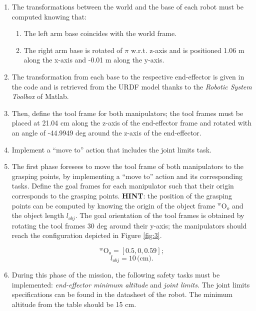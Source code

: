 \documentclass{article}
\begin{document}
\begin{enumerate}
	\item The transformations between the world and the base of each robot must be computed knowing that: 
	\begin{enumerate}
		\item The left arm base coincides with the world frame.
		\item The right arm base is rotated of $\pi$ w.r.t. z-axis and is positioned 1.06 m along the x-axis and -0.01 m along the y-axis.
		
	\end{enumerate}

	\item The transformation from each base to the respective end-effector is given in the code and is retrieved from the URDF model thanks to the \textit{Robotic System Toolbox} of Matlab.
	
	\item Then, define the tool frame for both manipulators; the tool frames must be placed at 21.04 cm along the z-axis of the end-effector frame and rotated with an angle of -44.9949 deg around the z-axis of the end-effector.
	
	\item Implement a ``move to'' action that includes the joint limits task.
	
	
	\item The first phase foresees to move the tool frame of both manipulators to the grasping points, by implementing  a ``move to'' action and its corresponding tasks. Define the goal frames for each manipulator such that their origin corresponds to the grasping points. \textbf{HINT}: the position of the grasping points can be computed by knowing the origin of the object frame $^{w}\textrm{O}_{o}$ and the object length $l_{obj}$. The goal orientation of the tool frames is obtained by rotating the tool frames 30 deg around their y-axis; the manipulators should reach the configuration depicted in Figure \ref{fig:3}. 
	

	\begin{equation}
		^{w}\textrm{O}_{o} = [0.5, 0, 0.59];
	\end{equation}
	\begin{equation}
		l_{obj} = 10\,  \text{(cm)}.
	\end{equation}

	\item During this phase of the mission, the following safety tasks must be implemented: \textit{end-effector minimum altitude} and \textit{joint limits}. The joint limits specifications can be found in the datasheet of the robot. The minimum altitude from the table should be 15 cm. 
\end{enumerate}
\end{document}
